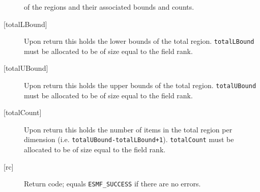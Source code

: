 \begin{description}
   of the regions and their associated bounds and counts.
   \item[{[totalLBound]}]
   Upon return this holds the lower bounds of the total region.
   {\tt totalLBound} must be allocated to be of size equal to the field rank.
   \item[{[totalUBound]}]
   Upon return this holds the upper bounds of the total region.
   {\tt totalUBound} must be allocated to be of size equal to the field rank.
   \item[{[totalCount]}]
   \begin{sloppypar}
   Upon return this holds the number of items in the total region per dimension
   (i.e. {\tt totalUBound-totalLBound+1}). {\tt totalCount} must
   be allocated to be of size equal to the field rank.
   \end{sloppypar}
   \item[{[rc]}]
   Return code; equals {\tt ESMF\_SUCCESS} if there are no errors.
   \end{description}
\setlength{\parskip}{\oldparskip}
\setlength{\parindent}{\oldparindent}
\setlength{\baselineskip}{\oldbaselineskip}
